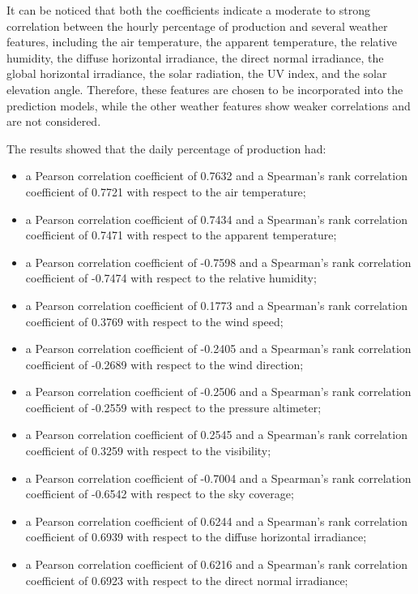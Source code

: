 It can be noticed that both the coefficients indicate a moderate to strong correlation between the hourly percentage of production and several weather features, including the air temperature, the apparent temperature, the relative humidity, the diffuse horizontal irradiance, the direct normal irradiance, the global horizontal irradiance, the solar radiation, the UV index, and the solar elevation angle.
Therefore, these features are chosen to be incorporated into the prediction models, while the other weather features show weaker correlations and are not considered.

The results showed that the daily percentage of production had:
\begin{itemize}
  \item a Pearson correlation coefficient of 0.7632 and a Spearman's rank correlation coefficient of 0.7721 with respect to the air temperature;
  \item a Pearson correlation coefficient of 0.7434 and a Spearman's rank correlation coefficient of 0.7471 with respect to the apparent temperature;
  \item a Pearson correlation coefficient of -0.7598 and a Spearman's rank correlation coefficient of -0.7474 with respect to the relative humidity;
  \item a Pearson correlation coefficient of 0.1773 and a Spearman's rank correlation coefficient of 0.3769 with respect to the wind speed;
  \item a Pearson correlation coefficient of -0.2405 and a Spearman's rank correlation coefficient of -0.2689 with respect to the wind direction;
  \item a Pearson correlation coefficient of -0.2506 and a Spearman's rank correlation coefficient of -0.2559 with respect to the pressure altimeter;
  \item a Pearson correlation coefficient of 0.2545 and a Spearman's rank correlation coefficient of 0.3259 with respect to the visibility;
  \item a Pearson correlation coefficient of -0.7004 and a Spearman's rank correlation coefficient of -0.6542 with respect to the sky coverage;
  \item a Pearson correlation coefficient of 0.6244 and a Spearman's rank correlation coefficient of 0.6939 with respect to the diffuse horizontal irradiance;
  \item a Pearson correlation coefficient of 0.6216 and a Spearman's rank correlation coefficient of 0.6923 with respect to the direct normal irradiance;

\end{itemize}
